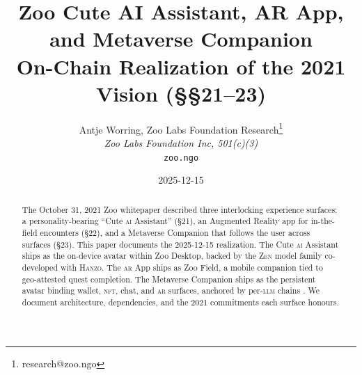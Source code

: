\documentclass[11pt,letterpaper]{article}
\title{\textbf{Zoo Cute AI Assistant, AR App, and Metaverse Companion}\\[0.3em]
\large On-Chain Realization of the 2021 Vision (\S\S21--23)}
\author{Antje Worring, Zoo Labs Foundation Research\thanks{research@zoo.ngo}\\
\textit{Zoo Labs Foundation Inc, 501(c)(3)}\\
\texttt{zoo.ngo}}
\date{2025-12-15}
\newcommand{\Hanzo}{\textsc{Hanzo}}
\newcommand{\Zen}{\textsc{Zen}}
\newcommand{\AR}{\textsc{ar}}
\newcommand{\AI}{\textsc{ai}}
\newcommand{\NFT}{\textsc{nft}}
\begin{document}
\zoocoverpage

\begin{abstract}
\noindent The October 31, 2021 Zoo whitepaper described three
interlocking experience surfaces: a personality-bearing ``Cute \AI{}
Assistant'' (\S21), an Augmented Reality app for in-the-field
encounters (\S22), and a Metaverse Companion that follows the user
across surfaces (\S23). This paper documents the 2025-12-15
realization. The Cute \AI{} Assistant ships as the on-device avatar
within Zoo Desktop, backed by the \Zen{} model family co-developed
with \Hanzo{}. The \AR{} App ships as Zoo Field, a mobile companion
tied to geo-attested quest completion. The Metaverse Companion ships
as the persistent avatar binding wallet, \NFT{}, chat, and \AR{}
surfaces, anchored by per-\textsc{llm}{} chains
\cite{zoo-perllm-chains}. We document architecture, dependencies, and
the 2021 commitments each surface honours.
\end{abstract}





\end{document}
